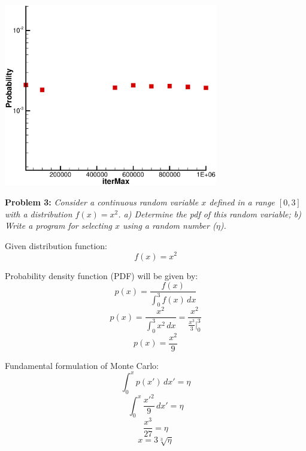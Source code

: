 \documentclass[12pt]{article}
\begin{document}
\begin{center}
\includegraphics[width=0.7\textwidth]{probFlush.eps}
\end{center}


\textbf{Problem 3:}
\textit{Consider a continuous random variable $x$ defined in a range
$[0, 3]$ with a distribution $f(x) = x^2$.  a) Determine the pdf of this
random variable; b) Write a program for selecting $x$ using a random
number ($\eta$).}

Given distribution function:
\begin{equation}
  f(x) = x^2
  \label{eq_dist_func}
\end{equation}

Probability density function (PDF) will be given by:
\begin{equation}
  p(x) = \frac{f(x)}{\int_{0}^{3}f(x)\,dx}
\end{equation}
\begin{equation}
  p(x) = \frac{x^2}{\int_{0}^{3}x^2\,dx} =
  \frac{x^2}{\frac{x^3}{3}\bigg|_{0}^{3}}
\end{equation}
\begin{equation}
  p(x) = \frac{x^2}{9}
\end{equation}

Fundamental formulation of Monte Carlo:
\begin{equation}
  \int_{0}^{x}p(x')\,dx' = \eta
\end{equation}
\begin{equation}
  \int_{0}^{x}\frac{x'^2}{9}\,dx' = \eta
\end{equation}
\begin{equation}
  \frac{x^3}{27} = \eta
\end{equation}
\begin{equation}
  x = 3\sqrt[3]\eta
\end{equation}
\end{document}
